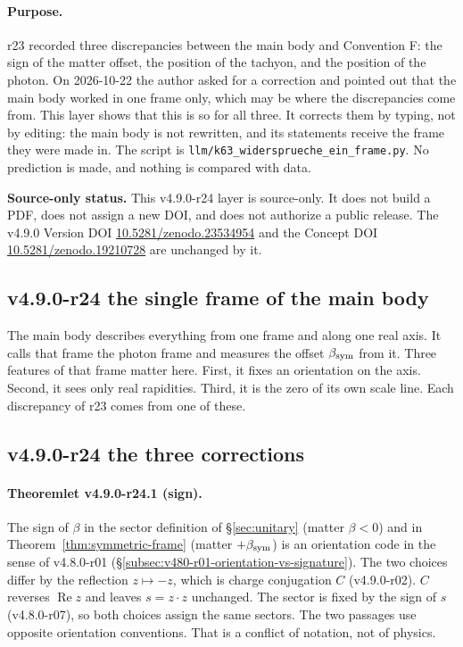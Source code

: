 \paragraph{Purpose.}
r23 recorded three discrepancies between the main body and Convention F: the sign of the matter offset, the position of the
tachyon, and the position of the photon.  On 2026-10-22 the author asked for a correction and pointed out that the main body
worked in one frame only, which may be where the discrepancies come from.  This layer shows that this is so for all three.  It
corrects them by typing, not by editing: the main body is not rewritten, and its statements receive the frame they were made
in.  The script is \texttt{llm/k63\_widersprueche\_ein\_frame.py}.  No prediction is made, and nothing is compared with data.

\noindent\textbf{Source-only status.}
This v4.9.0-r24 layer is source-only.  It does not build a PDF, does not assign a new DOI,
and does not authorize a public release.  The v4.9.0 Version DOI
\href{https://doi.org/10.5281/zenodo.23534954}{10.5281/zenodo.23534954} and the Concept DOI
\href{https://doi.org/10.5281/zenodo.19210728}{10.5281/zenodo.19210728} are unchanged by it.

\subsection*{v4.9.0-r24 the single frame of the main body}
\label{subsec:v490-r24-single-frame}

The main body describes everything from one frame and along one real axis.  It calls that frame the photon frame and measures
the offset \(\beta_{\mathrm{sym}}\) from it.  Three features of that frame matter here.  First, it fixes an orientation on the axis.  Second, it
sees only real rapidities.  Third, it is the zero of its own scale line.  Each discrepancy of r23 comes from one of these.

\subsection*{v4.9.0-r24 the three corrections}
\label{subsec:v490-r24-corrections}

\paragraph{Theoremlet v4.9.0-r24.1 (sign).}
The sign of \(\beta\) in the sector definition of \S\ref{sec:unitary} (matter \(\beta<0\)) and in Theorem~\ref{thm:symmetric-frame}
(matter \(+\beta_{\mathrm{sym}}\)) is an orientation code in the sense of v4.8.0-r01
(\S\ref{subsec:v480-r01-orientation-vs-signature}).  The two choices differ by the reflection \(z\mapsto-z\), which is charge
conjugation \(C\) (v4.9.0-r02).  \(C\) reverses \(\operatorname{Re}z\) and leaves \(s=z\cdot z\) unchanged.  The sector is fixed by the sign
of \(s\) (v4.8.0-r07), so both choices assign the same sectors.  The two passages use opposite orientation conventions.  That is
a conflict of notation, not of physics.

